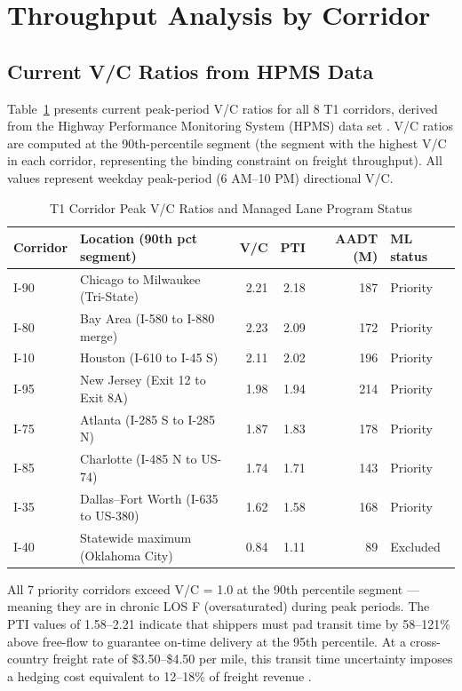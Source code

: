 \section{Throughput Analysis by Corridor}
\label{sec:throughput}

\subsection{Current V/C Ratios from HPMS Data}

Table~\ref{tab:vc-current} presents current peak-period V/C ratios for all 8 T1 corridors, derived from the Highway Performance Monitoring System (HPMS) data set \citep{FHWA_HPMS2023}. V/C ratios are computed at the 90th-percentile segment (the segment with the highest V/C in each corridor, representing the binding constraint on freight throughput). All values represent weekday peak-period (6 AM--10 PM) directional V/C.

\begin{table}[h!]
\centering
\caption{T1 Corridor Peak V/C Ratios and Managed Lane Program Status}
\label{tab:vc-current}
\begin{tabular}{llrrrl}
\toprule
\textbf{Corridor} & \textbf{Location (90th pct segment)} & \textbf{V/C} & \textbf{PTI} & \textbf{AADT (M)} & \textbf{ML status} \\
\midrule
I-90  & Chicago to Milwaukee (Tri-State)    & 2.21 & 2.18 & 187 & Priority \\
I-80  & Bay Area (I-580 to I-880 merge)     & 2.23 & 2.09 & 172 & Priority \\
I-10  & Houston (I-610 to I-45 S)           & 2.11 & 2.02 & 196 & Priority \\
I-95  & New Jersey (Exit 12 to Exit 8A)     & 1.98 & 1.94 & 214 & Priority \\
I-75  & Atlanta (I-285 S to I-285 N)        & 1.87 & 1.83 & 178 & Priority \\
I-85  & Charlotte (I-485 N to US-74)        & 1.74 & 1.71 & 143 & Priority \\
I-35  & Dallas--Fort Worth (I-635 to US-380) & 1.62 & 1.58 & 168 & Priority \\
I-40  & Statewide maximum (Oklahoma City)   & 0.84 & 1.11 &  89 & Excluded \\
\bottomrule
\end{tabular}
\end{table}

All 7 priority corridors exceed V/C = 1.0 at the 90th percentile segment --- meaning they are in chronic LOS F (oversaturated) during peak periods. The PTI values of 1.58--2.21 indicate that shippers must pad transit time by 58--121\% above free-flow to guarantee on-time delivery at the 95th percentile. At a cross-country freight rate of \$3.50--\$4.50 per mile, this transit time uncertainty imposes a hedging cost equivalent to 12--18\% of freight revenue \citep{ATRI_costs2024}.

